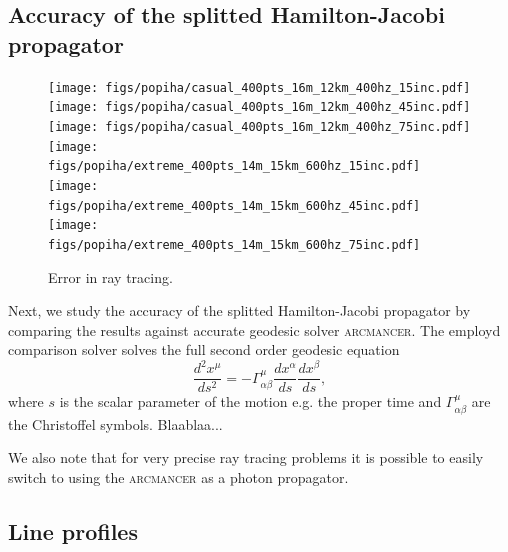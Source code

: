 \documentclass[iop, usenatbib]{emulateapj}
\newcommand{\be}{\begin{equation}}
\newcommand{\ee}{\end{equation}}
\begin{document}
\subsection{Accuracy of the splitted Hamilton-Jacobi propagator}

\begin{figure}
\centering
\texttt{[image: figs/popiha/casual\_400pts\_16m\_12km\_400hz\_15inc.pdf]}
\texttt{[image: figs/popiha/casual\_400pts\_16m\_12km\_400hz\_45inc.pdf]}
\texttt{[image: figs/popiha/casual\_400pts\_16m\_12km\_400hz\_75inc.pdf]}
\texttt{[image: figs/popiha/extreme\_400pts\_14m\_15km\_600hz\_15inc.pdf]}
\texttt{[image: figs/popiha/extreme\_400pts\_14m\_15km\_600hz\_45inc.pdf]}
\texttt{[image: figs/popiha/extreme\_400pts\_14m\_15km\_600hz\_75inc.pdf]}
\caption{\label{fig:H_C1_C2}
  Error in ray tracing.
  }
\end{figure}

Next, we study the accuracy of the splitted Hamilton-Jacobi propagator by comparing the results against accurate geodesic solver \textsc{arcmancer}.
The employd comparison solver solves the full second order geodesic equation
\be
\frac{d^2 x^{\mu}}{ds^2} = -\Gamma^{\mu}_{\alpha \beta} \frac{dx^{\alpha}}{ds} \frac{dx^{\beta}}{ds},
\ee
where $s$ is the scalar parameter of the motion e.g. the proper time and $\Gamma^{\mu}_{\alpha \beta}$ are the Christoffel symbols.
Blaablaa...

We also note that for very precise ray tracing problems it is possible to easily switch to using the \textsc{arcmancer} as a photon propagator.





\subsection{Line profiles}
\end{document}

